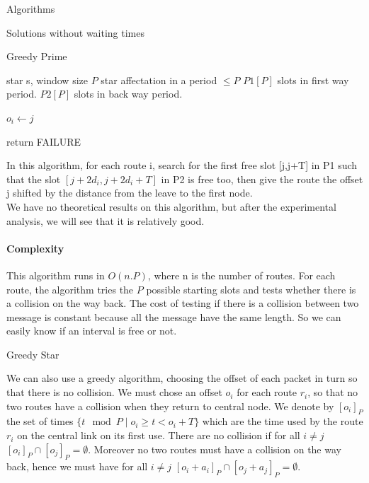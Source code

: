\documentclass[a4paper,10pt]{report}
\begin{document}
\begin{chapter}{Algorithms}
\begin{section}{Solutions without waiting times}
\begin{subsection}{Greedy Prime}
\begin{algorithm}[H]
\caption{Greedy Prime assignment}
\begin{algorithmic}
\REQUIRE star s, window size $P$
\ENSURE star affectation in a period $\leq P$ 
\STATE $P1[P]$ slots in first way period.
\STATE $P2[P]$ slots in back way period.




\STATE $o_i \leftarrow j$
\ENDIF

\ENDIF
{}
\STATE return FAILURE
\ENDIF
\ENDFOR

\ENDFOR

\end{algorithmic}
\end{algorithm}


In this algorithm, for each route i, search for the first free slot [j,j+T] in P1 such that the slot $[j + 2d_i,j + 2d_i+T]$ in P2 is free too,
then give the route the offset j shifted by the distance from the leave to the first node.\\

We have no theoretical results on this algorithm, but after the experimental analysis, we will see that it is relatively good.


\paragraph{Complexity}
This algorithm runs in $O(n.P)$, where n is the number of routes. For each route, the algorithm tries the $P$ possible
starting slots and tests whether there is a collision on the way back.
The cost of testing if there is a collision between two message is constant because all the message have the same length. So we can easily know if an interval is free or not.

\end{subsection}




\begin{subsection}{Greedy Star}
 

We can also use a greedy algorithm, choosing the offset of each packet in turn so that there is no collision. 
We must chose an offset $o_i$ for each route $r_i$, so that no two routes have a collision when they return to central node.  
We denote by $[o_i]_P$ the set of times $\{ t \mod P \mid o_i \geq t < o_i + T \}$ which are the time used by the route $r_i$ on the central
link on its first use. There are no collision if for all $i\neq j$
 $[o_i]_P \cap [o_j]_P = \emptyset$. Moreover no two routes must have a collision on the way back, hence we must have for all $i\neq j$
 $[o_i + a_i]_P \cap [o_j + a_j]_P = \emptyset$.
 

\end{subsection}
\end{section}
\end{chapter}
\end{document}
